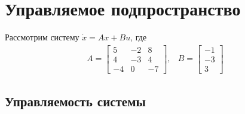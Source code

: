 \section{Управляемое подпространство}

Рассмотрим систему $\dot{x} = Ax + Bu$, где 
\begin{equation}
    \begin{array}{cc}
        A = \begin{bmatrix}
            5 & -2 & 8 \\
            4 & -3 & 4 \\
            -4 & 0 & -7
        \end{bmatrix}, &
        B = \begin{bmatrix}
            -1 \\
            -3 \\
            3
        \end{bmatrix}
    \end{array}
\end{equation}

\subsection{Управляемость системы}
